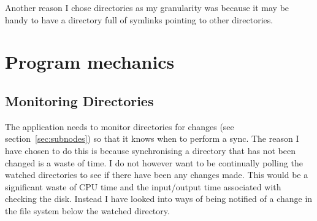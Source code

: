 \documentclass[12pt]{article}
\begin{document}
Another reason I chose directories as my granularity was because it may be
handy to have a directory full of symlinks pointing to other directories.

\section{Program mechanics}
\subsection{Monitoring Directories}
The application needs to monitor directories for changes
(see section~\ref{sec:subnodes})
so that it knows when to perform a sync. The reason I have
chosen to do this is because synchronising a directory that
has not been changed is a waste of time. I do not
however want to be continually polling the watched
directories to see if there have been any changes made.
This would be a significant waste of CPU time and the input/output
time associated with checking the disk. Instead
I have looked into ways of being notified of a
change in the file system below the watched directory.
\end{document}
